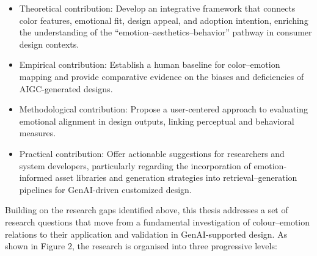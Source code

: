 \begin{itemize}

  \item Theoretical contribution: Develop an integrative framework that connects color features, emotional fit, design appeal, and adoption intention, enriching the understanding of the “emotion–aesthetics–behavior” pathway in consumer design contexts.

  \item Empirical contribution: Establish a human baseline for color–emotion mapping and provide comparative evidence on the biases and deficiencies of AIGC-generated designs.

  \item Methodological contribution: Propose a user-centered approach to evaluating emotional alignment in design outputs, linking perceptual and behavioral measures.

  \item Practical contribution: Offer actionable suggestions for researchers and system developers, particularly regarding the incorporation of emotion-informed asset libraries and generation strategies into retrieval–generation pipelines for GenAI-driven customized design.

\end{itemize}

Building on the research gaps identified above, this thesis addresses a set of research questions that move from a fundamental investigation of colour–emotion relations to their application and validation in GenAI-supported design. As shown in Figure 2, the research is organised into three progressive levels:

